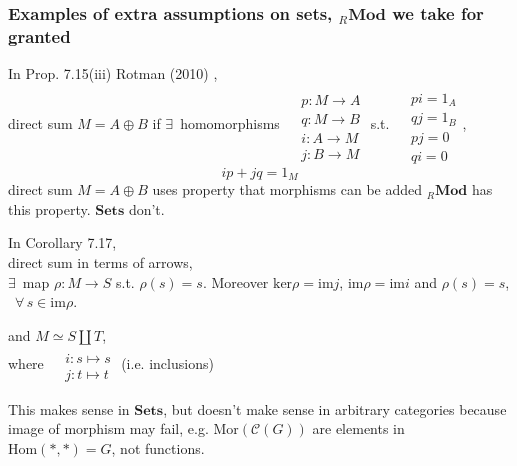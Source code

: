 \subsubsection{Examples of extra assumptions on sets, ${}_R\textbf{Mod}$ we take for granted}

In Prop. 7.15(iii) Rotman (2010) \cite{agat:JRotman2010}, \\
direct sum $M=A\oplus B$ if $\exists \, $ homomorphisms $\begin{aligned} & \quad \\
& p:M\to A \\
& q:M\to B \\
& i:A\to M \\
& j:B\to M \end{aligned}$ s.t. $\begin{aligned} & \quad \\
& pi = 1_A \\
& qj = 1_B \\ 
& pj = 0 \\ & qi = 0 \end{aligned}$, 
\[
ip + jq = 1_M
\]
direct sum $M = A\oplus B$ uses property that morphisms can be added ${}_R\textbf{Mod}$ has this property. $\textbf{Sets}$ don't.  

In Corollary 7.17, \\
direct sum in terms of arrows, \\
$\exists \, $ map $\rho:M \to S$ s.t. $\rho(s)=s$.  Moreover $\text{ker}\rho = \text{im}j$, $\text{im}\rho = \text{im}i$ and $\rho(s)=s$, \, $\forall \, s \in \text{im}\rho$.  

and $M\simeq S \coprod T$, \\
where $\begin{aligned} & \quad \\
& i: s \mapsto s \\ 
& j : t \mapsto t \end{aligned}$ (i.e. inclusions)

This makes sense in $\textbf{Sets}$, but doesn't make sense in arbitrary categories because image of morphism may fail, e.g. $\text{Mor}(\mathcal{C}(G))$ are elements in $\text{Hom}(*,*) =G$, not functions.  

